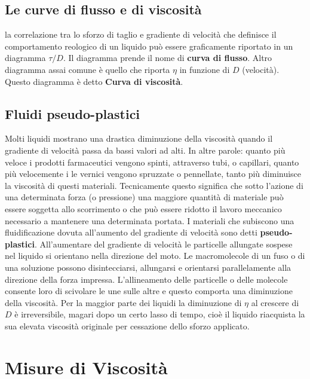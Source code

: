 \section{Le curve di flusso e di viscosità}
la correlazione tra lo sforzo di taglio e gradiente di velocità che definisce il comportamento reologico di un liquido può essere graficamente riportato in un diagramma $\tau/D$. Il diagramma prende il nome di \textbf{curva di flusso}.
Altro diagramma assai comune è quello che riporta $\eta$ in funzione di $D$ (velocità). Questo diagramma è detto \textbf{Curva di viscosità}.

\section{Fluidi pseudo-plastici}
Molti liquidi mostrano una drastica diminuzione della viscosità quando il gradiente di velocità passa da bassi valori ad alti. In altre parole: quanto più veloce i prodotti farmaceutici vengono spinti, attraverso tubi, o capillari, quanto più velocemente i le vernici vengono spruzzate o pennellate, tanto più diminuisce la viscosità di questi materiali.
Tecnicamente questo significa che sotto l'azione di una determinata forza (o pressione) una maggiore quantità di materiale può essere soggetta allo scorrimento o che può essere ridotto il lavoro meccanico necessario a mantenere una determinata portata.
I materiali che subiscono una fluidificazione dovuta all'aumento del gradiente di velocità sono detti \textbf{pseudo-plastici}.
All'aumentare del gradiente di velocità le particelle allungate sospese nel liquido si orientano nella direzione del moto. Le macromolecole di un fuso o di una soluzione possono disintecciarsi, allungarsi e orientarsi parallelamente alla direzione della forza impressa. L'allineamento delle particelle o delle molecole consente loro di scivolare le une sulle altre e questo comporta una diminuzione della viscosità.
Per la maggior parte dei liquidi la diminuzione di $\eta$ al crescere di $D$ è irreversibile, magari dopo un certo lasso di tempo, cioè il liquido riacquista la sua elevata viscosità originale per cessazione dello sforzo applicato.


\chapter{Misure di Viscosità}\label{chp:MisureViscosità}
